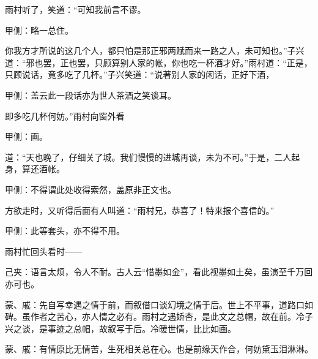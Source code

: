 \begin{parag}
    雨村听了，笑道：“可知我前言不谬。\begin{note}甲侧：略一总住。\end{note}你我方才所说的这几个人，都只怕是那正邪两赋而来一路之人，未可知也。”子兴道：“邪也罢，正也罢，只顾算别人家的帐，你也吃一杯酒才好。”雨村道：“正是，只顾说话，竟多吃了几杯。”子兴笑道：“说著别人家的闲话，正好下酒，\begin{note}甲侧：盖云此一段话亦为世人茶酒之笑谈耳。\end{note}即多吃几杯何妨。”雨村向窗外看\begin{note}甲侧：画。\end{note}道：“天也晚了，仔细关了城。我们慢慢的进城再谈，未为不可。”于是，二人起身，算还酒帐。\begin{note}甲侧：不得谓此处收得索然，盖原非正文也。\end{note}
\end{parag}


\begin{parag}
    方欲走时，又听得后面有人叫道：“雨村兄，恭喜了！特来报个喜信的。”
\end{parag}


\begin{parag}
    \begin{note}甲侧：此等套头，亦不得不用。\end{note}雨村忙回头看时——\begin{note}己夹：语言太烦，令人不耐。古人云“惜墨如金”，看此视墨如土矣，虽演至千万回亦可也。\end{note}
\end{parag}


\begin{parag}
    \begin{note}蒙、戚：先自写幸遇之情于前，而叙借口谈幻境之情于后。世上不平事，道路口如碑。虽作者之苦心，亦人情之必有。雨村之遇娇杏，是此文之总帽，故在前。冷子兴之谈，是事迹之总帽，故叙写于后。冷暖世情，比比如画。\end{note}
\end{parag}


\begin{parag}
    \begin{note}蒙、戚：有情原比无情苦，生死相关总在心。也是前缘天作合，何妨黛玉泪淋淋。\end{note}
\end{parag}

